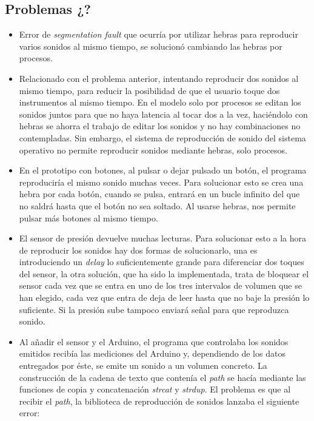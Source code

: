\documentclass{article}
\begin{document}

    \subsection{Problemas ¿?} %
    \label{sub:Problemas}

        \begin{itemize}
            \item
            Error de \textit{segmentation fault} que ocurría por utilizar hebras para reproducir
            varios sonidos al mismo tiempo, se solucionó cambiando las hebras por procesos.
            \item
            Relacionado con el problema anterior, intentando reproducir dos sonidos al mismo tiempo, para reducir
            la posibilidad de que el usuario toque dos instrumentos al mismo tiempo. En el modelo solo por procesos
            se editan los sonidos juntos para que no haya latencia al tocar dos a la vez, haciéndolo con hebras se
            ahorra el trabajo de editar los sonidos y no hay combinaciones no contempladas. Sin embargo, el sistema
            de reproducción de sonido del sistema operativo no permite reproducir sonidos mediante hebras, solo
            procesos.
            \item
            En el prototipo con botones, al pulsar o dejar pulsado un botón, el programa reproduciría el mismo
            sonido muchas veces. Para solucionar esto se crea una hebra por cada botón, cuando se pulsa, entrará
            en un bucle infinito del que no saldrá hasta que el botón no sea soltado. Al usarse hebras, nos
            permite pulsar más botones al mismo tiempo.
            \item
            El sensor de presión devuelve muchas lecturas. Para solucionar esto a la hora de reproducir los sonidos
            hay dos formas de solucionarlo, una es introduciendo un \textit{delay} lo suficientemente grande para
            diferenciar dos toques del sensor, la otra solución, que ha sido la implementada, trata de bloquear el
            sensor cada vez que se entra en uno de los tres intervalos de volumen que se han elegido, cada vez que
            entra de deja de leer hasta que no baje la presión lo suficiente. Si la presión sube tampoco enviará
            señal para que reproduzca sonido.
            \item
            Al añadir el sensor y el Arduino, el programa que controlaba los sonidos emitidos recibía las mediciones
            del Arduino y, dependiendo de los datos entregados por éste, se emite un sonido a un volumen concreto.
            La construcción de la cadena de texto que contenía el \textit{path} se hacía mediante las funciones de
            copia y concatenación \textit{strcat} y \textit{strdup}. El problema es que al recibir el \textit{path},
            la biblioteca de reproducción de sonidos lanzaba el siguiente error:


\end{itemize}
\end{document}
